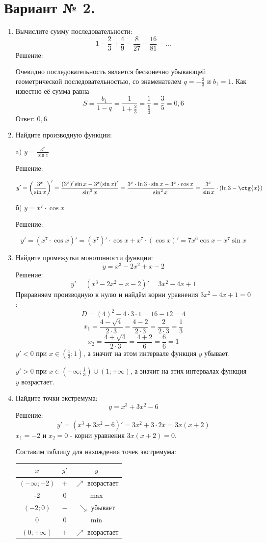 \documentclass{article}
\begin{document}
\section*{Вариант № 2.}
\begin{enumerate}

\item %
Вычислите сумму последовательности:
$$1-\frac{2}{3}+\frac{4}{9}-\frac{8}{27}+\frac{16}{81}-\ldots$$
Решение:

Очевидно последовательность является бесконечно убывающей геометрической последовательностью, со знаменателем $q=-\frac{2}{3}$ и $b_1=1$. Как известно её сумма равна $$S=\frac{b_1}{1-q}=\frac{1}{1+\frac{2}{3}}=\frac{1}{\frac{5}{3}}=\frac{3}{5}=0,6$$
Ответ: $0,6$.
\item %
Найдите производную функции:

a) $y=\frac{3^x}{\sin{x}}$

Решение:

$$y'=\left(\frac{3^x}{\sin{x}}\right)'=\frac{(3^x)'\sin{x}-3^x(\sin{x})'}{\sin^2{x}}=\frac{3^x\cdot\ln{3}\cdot\sin{x}-3^x\cdot\cos{x}}{\sin^2{x}}=\frac{3^x}{\sin{x}}\cdot(\ln{3}-\ctg{x})$$

б) $y=x^{7}\cdot\cos{x}$

Решение:

$$y'=\left(x^7\cdot\cos{x}\right)'=(x^7)'\cdot\cos{x}+x^7\cdot(\cos{x})'=7x^6\cos{x}-x^7\sin{x}$$

\item %
Найдите промежутки монотонности функции:
$$y=x^3-2x^2+x-2$$
Решение:
$$y'=\left(x^3-2x^2+x-2\right)'=3x^2-4x+1$$
Приравняем производную к нулю и найдём корни уравнения $3x^2-4x+1=0$:
$$D=(4)^2-4\cdot3\cdot1=16-12=4$$
$$x_1=\frac{4-\sqrt{4}}{2\cdot3}=\frac{4-2}{2\cdot3}=\frac{2}{2\cdot3}=\frac{1}{3}$$
$$x_2=\frac{4+\sqrt{4}}{2\cdot3}=\frac{4+2}{6}=\frac{6}{6}=1$$
$y'<0$ при $x\in\left(\frac{1}{3};1\right)$, а значит на этом интервале функция $y$ убывает.

$y'>0$ при $x\in\left(-\infty;\frac{1}{3}\right)\cup\left(1;+\infty\right)$, а значит на этих интервалах функция $y$ возрастает.
\item %
Найдите точки экстремума:
$$y=x^3+3x^2-6$$
Решение:
$$y'=\left(x^3+3x^2-6\right)'=3x^2+3\cdot2x=3x(x+2)$$
$x_1=-2$ и $x_2=0$ - корни уравнения $3x(x+2)=0$.

Составим таблицу для нахождения точек экстремума:

\begin{center}
\begin{tabular}{|c|c|c|}
\hline
$x$ & $y'$ & $y$ \\
\hline\hline
$\left(-\infty;-2\right)$ & $+$ & $\nearrow$ возрастает \\
\hline
-2 & 0 & max\\
\hline
$\left(-2;0\right)$ & $-$ & $\searrow$ убывает\\
\hline
0 & 0 & min \\
\hline
$\left(0;+\infty\right)$ & $+$ & $\nearrow$ возрастает \\
\hline
\end{tabular}
\end{center}


\end{enumerate}
\end{document}
